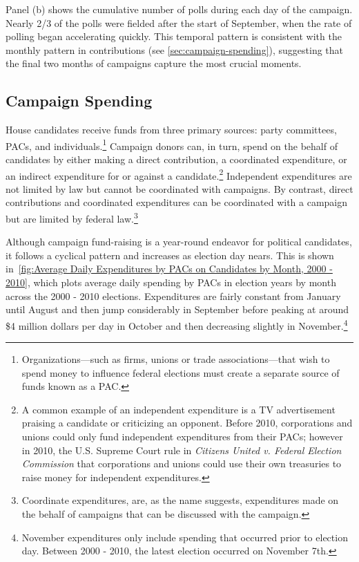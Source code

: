\documentclass[12pt,final,fleqn]{article}
\theoremstyle{plain}
\begin{document}
Panel (b) shows the cumulative number of polls during each day of the campaign. Nearly 2/3 of the polls were fielded after the start of September, when the rate of polling began accelerating quickly. This temporal pattern is consistent with the monthly pattern in contributions (see \autoref{sec:campaign-spending}), suggesting that the final two months of campaigns capture the most crucial moments.

\subsection{Campaign Spending} 
\label{sec:campaign-spending}
House candidates receive funds from three primary sources: party committees, PACs, and individuals.\footnote{Organizations---such as firms, unions or trade associations---that wish to spend money to influence federal elections must create a separate source of funds known as a PAC.} Campaign donors can, in turn, spend on the behalf of candidates by either making a direct contribution, a coordinated expenditure, or an indirect expenditure for or against a candidate.\footnote{A common example of an independent expenditure is a TV advertisement praising a candidate or criticizing an opponent. Before 2010, corporations and unions could only fund independent expenditures from their PACs; however in 2010, the U.S. Supreme Court rule in \emph{Citizens United v. Federal Election Commission} that corporations and unions could use their own treasuries to raise money for independent expenditures.} Independent expenditures are not limited by law but cannot be coordinated with campaigns. By contrast, direct contributions and coordinated expenditures can be coordinated with a campaign but are limited by federal law.\footnote{Coordinate expenditures, are, as the name suggests, expenditures made on the behalf of campaigns that can be discussed with the campaign.}

Although campaign fund-raising is a year-round endeavor for political candidates, it follows a cyclical pattern and increases as election day nears. This is shown in~\autoref{fig:Average Daily Expenditures by PACs on Candidates by Month, 2000 - 2010}, which plots average daily spending by PACs in election years by month across the 2000 - 2010 elections. Expenditures are fairly constant from January until August and then jump considerably in September before peaking at around \$4 million dollars per day in October and then decreasing slightly in November.\footnote{November expenditures only include spending that occurred prior to election day. Between 2000 - 2010, the latest election occurred on November 7th.} 
\end{document}
